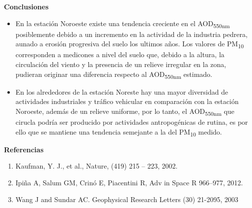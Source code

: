 \documentclass{article}
\begin{document}
\begin{minipage}{0.70\linewidth}
\begin{center}
\begin{shaded}
\textbf{\textcolor{ver}{Conclusiones}}
\end{shaded}
\end{center}
\begin{itemize}
    \item En la estación Noroeste existe una tendencia creciente en el AOD\textsubscript{550nm} posiblemente debido a un incremento en la actividad de la industria
    pedrera, aunado a erosión progresiva del suelo los ultimos años. Los valores de PM\textsubscript{10} corresponden a medicones a nivel del suelo que, debido a la altura,
     la circulación del viento y la presencia de un relieve irregular en la zona, pudieran originar una diferencia respecto al AOD\textsubscript{550nm} estimado.
     \item En los alrededores de la estación Noreste hay una mayor diversidad de actividades industriales
     y tráfico vehicular en comparación con la estación Noroeste, además de un relieve uniforme, por lo tanto, el AOD\textsubscript{550nm} que
     cirucla podría ser producido por actividades antropogénicas de rutina, es por ello que se mantiene una tendencia
      semejante a la del PM\textsubscript{10} medido.
\end{itemize}
\end{minipage}
\hspace{0.8cm}
\begin{minipage}{0.25\linewidth}
\vspace*{-0.6cm}
\begin{center}
\begin{shaded}
\textbf{\textcolor{ver}{Referencias}}
\end{shaded}
\end{center}
\begin{enumerate}
    \item Kaufman, Y. J., et al., Nature, (419) 215 – 223, 2002.
    \item Ipiña A, Salum GM, Crinó E, Piacentini R, Adv in Space R 966–977, 2012.
    \item Wang J and Sundar AC. Geophysical Research Letters (30) 21-2095, 2003
\end{enumerate}
\end{minipage}
\end{document}
